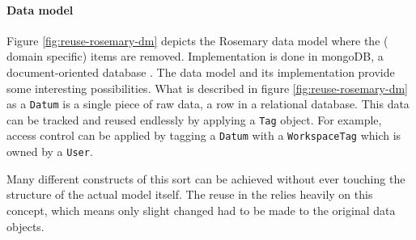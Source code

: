 \paragraph{Data model}
Figure \ref{fig:reuse-rosemary-dm} depicts the Rosemary data model where the (\ie{} domain specific) items are removed.
Implementation is done in mongoDB, a document-oriented database \cite{}.
The data model and its implementation provide some interesting possibilities.
What is described in figure \ref{fig:reuse-rosemary-dm} as a {\tt Datum} is a single piece of raw data, \ie{} a row in a relational database.
This data can be tracked and reused endlessly by applying a {\tt Tag} object.
For example, access control can be applied by tagging a {\tt Datum} with a {\tt WorkspaceTag} which is owned by a {\tt User}.

Many different constructs of this sort can be achieved without ever touching the structure of the actual model itself.
The reuse in the \ivfsystem{} relies heavily on this concept, which means only slight changed had to be made to the original data objects.